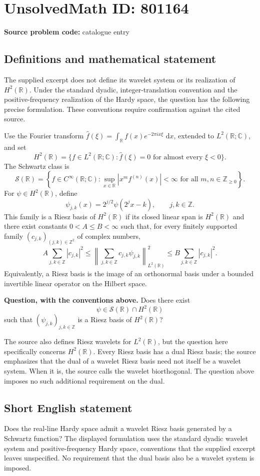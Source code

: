 \documentclass[11pt]{article}
\newcommand{\Z}{\mathbb{Z}}
\newcommand{\R}{\mathbb{R}}
\newcommand{\C}{\mathbb{C}}
\newcommand{\dd}{\,\mathrm{d}}
\begin{document}
\section*{UnsolvedMath ID: 801164}
\textbf{Source problem code:} catalogue entry
\subsection{Definitions and mathematical statement}
The supplied excerpt does not define its wavelet system or its realization of \(H^2(\R)\). Under the standard dyadic, integer-translation convention and the positive-frequency realization of the Hardy space, the question has the following precise formulation. These conventions require confirmation against the cited source.

Use the Fourier transform \(\widehat f(\xi)=\int_{\R}f(x)e^{-2\pi i x\xi}\,\dd x\), extended to \(L^2(\R;\C)\), and set
\[
H^2(\R)=\{f\in L^2(\R;\C):\widehat f(\xi)=0\text{ for almost every }\xi<0\}.
\]
The Schwartz class is
\[
\mathcal S(\R)=\left\{f\in C^\infty(\R;\C):\sup_{x\in\R}|x^m f^{(n)}(x)|<\infty\text{ for all }m,n\in\Z_{\geq0}\right\}.
\]
For \(\psi\in H^2(\R)\), define
\[
\psi_{j,k}(x)=2^{j/2}\psi(2^j x-k),\qquad j,k\in\Z.
\]
This family is a Riesz basis of \(H^2(\R)\) if its closed linear span is \(H^2(\R)\) and there exist constants \(0<A\leq B<\infty\) such that, for every finitely supported family \((c_{j,k})_{(j,k)\in\Z^2}\) of complex numbers,
\[
A\sum_{j,k\in\Z}|c_{j,k}|^2
\leq
\left\|\sum_{j,k\in\Z}c_{j,k}\psi_{j,k}\right\|_{L^2(\R)}^2
\leq
B\sum_{j,k\in\Z}|c_{j,k}|^2.
\]
Equivalently, a Riesz basis is the image of an orthonormal basis under a bounded invertible linear operator on the Hilbert space.

\textbf{Question, with the conventions above.} Does there exist
\[
\psi\in\mathcal S(\R)\cap H^2(\R)
\]
such that \((\psi_{j,k})_{j,k\in\Z}\) is a Riesz basis of \(H^2(\R)\)?

The source also defines Riesz wavelets for \(L^2(\R)\), but the question here specifically concerns \(H^2(\R)\). Every Riesz basis has a dual Riesz basis; the source emphasizes that the dual of a wavelet Riesz basis need not itself be a wavelet system. When it is, the source calls the wavelet biorthogonal. The question above imposes no such additional requirement on the dual.
\subsection{Short English statement}
Does the real-line Hardy space admit a wavelet Riesz basis generated by a Schwartz function? The displayed formulation uses the standard dyadic wavelet system and positive-frequency Hardy space, conventions that the supplied excerpt leaves unspecified. No requirement that the dual basis also be a wavelet system is imposed.
\end{document}
